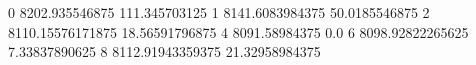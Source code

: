 0 8202.935546875 111.345703125
1 8141.6083984375 50.0185546875
2 8110.15576171875 18.56591796875
4 8091.58984375 0.0
6 8098.92822265625 7.33837890625
8 8112.91943359375 21.32958984375
